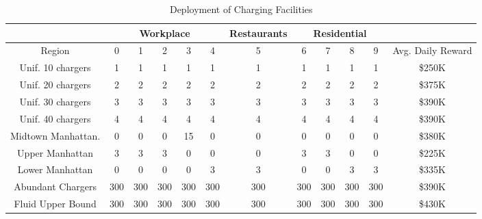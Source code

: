 \begin{table}[htb]
    \centering
    \begin{tabular}{|c|c|c|c|c|c|c|c|c|c|c|c|}
        \hline
         & \multicolumn{5}{c|}{Workplace} & \multicolumn{1}{c|}{Restaurants} & \multicolumn{4}{c|}{Residential} & \\
        \hline
        Region & 0 & 1 & 2 & 3 & 4 & 5 & 6 & 7 & 8 & 9 & Avg. Daily Reward\\
        \hline
        Unif. 10 chargers & 1 & 1 & 1 & 1 & 1 & 1 & 1 & 1 & 1 & 1 & \$250K\\ %
        Unif. 20 chargers & 2 & 2 & 2 & 2 & 2 & 2 & 2 & 2 & 2 & 2 & \$375K\\ %
        Unif. 30 chargers & 3 & 3 & 3 & 3 & 3 & 3 & 3 & 3 & 3 & 3 & \$390K\\ %
        Unif. 40 chargers & 4 & 4 & 4 & 4 & 4 & 4 & 4 & 4 & 4 & 4 & \$390K\\ %
        \hline
        Midtown Manhattan. & 0 & 0 & 0 & 15 & 0 & 0 & 0 & 0 & 0 & 0 & \$380K\\ %
        Upper Manhattan & 3 & 3 & 3 & 0 & 0 & 0 & 3 & 3 & 0 & 0 & \$225K\\ %
        Lower Manhattan & 0 & 0 & 0 & 0 & 3 & 3 & 0 & 0 & 3 & 3 & \$335K\\ %
        \hline
        Abundant Chargers & 300 & 300 & 300 & 300 & 300 & 300 & 300 & 300 & 300 & 300 & \$390K\\ %
        \hline
        Fluid Upper Bound & 300 & 300 & 300 & 300 & 300 & 300 & 300 & 300 & 300 & 300 & \$430K\\
        \hline
    \end{tabular}
    \caption{Deployment of Charging Facilities}
    \label{tab:charging-facility-deployment}
\end{table}

